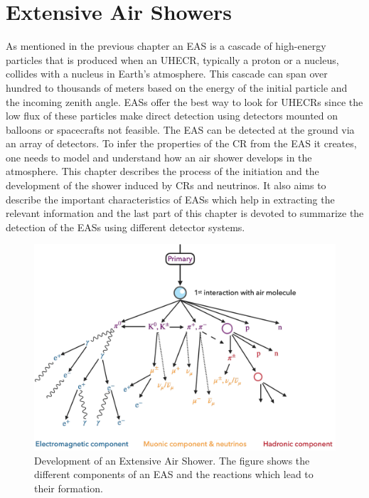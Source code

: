 
\chapter{Extensive Air Showers}
\label{chap:EAS}

As mentioned in the previous chapter an \gls{EAS} is a cascade of high-energy particles that is produced when an \gls{UHECR}, typically a proton or a nucleus, collides with a nucleus in Earth's atmosphere. This cascade can span over hundred to thousands of meters based on the energy of the initial particle and the incoming zenith angle. EASs offer the best way to look for UHECRs since the low flux of these particles make direct detection using detectors mounted on balloons or spacecrafts not feasible. The EAS can be detected at the ground via an array of detectors. To infer the properties of the \gls{CR} from the EAS it creates, one needs to model and understand how an air shower develops in the atmosphere. This chapter describes the process of the initiation and the development of the shower induced by CRs and neutrinos. It also aims to describe the important characteristics of EASs which help in extracting the relevant information and the last part of this chapter is devoted to summarize the detection of the EASs using different detector systems. 

\begin{figure}[t!]
    \centering
    \includegraphics[width=14.5cm]{thesis_figures/EAS/EAS_reactions.pdf}
    \caption{Development of an Extensive Air Shower. The figure shows the different components of an EAS and the reactions which lead to their formation.}
    \label{fig:EAS_components}
\end{figure}

